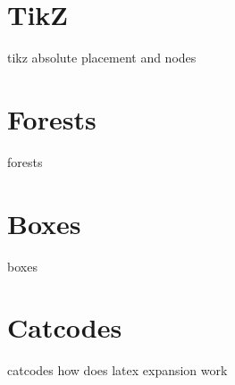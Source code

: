 \section{TikZ}

\begin{frame}{\insertsection}
   tikz absolute placement and nodes
\end{frame}

\section{Forests}
\begin{frame}{\insertsection}
   forests
\end{frame}

\section{Boxes}
\begin{frame}{\insertsection}
   boxes
\end{frame}

\section{Catcodes}
\begin{frame}{\insertsection}
   catcodes
   how does latex expansion work
\end{frame}




